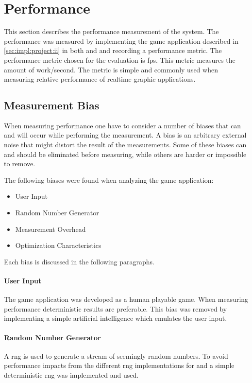 \section{Performance}

This section describes the performance measurement of the system.
The performance was measured by implementing the game application described in \autoref{sec:impl:project:ii} in both {\C} and {\rust} and recording a performance metric.
The performance metric chosen for the evaluation is \gls{fps}.
This metric measures the amount of work/second.
The metric is simple and commonly used when measuring relative performance of realtime graphic applications.

\subsection{Measurement Bias}
\label{sec:perf:bias}

When measuring performance one have to consider a number of biases that can and will occur while performing the measurement.
A bias is an arbitrary external noise that might distort the result of the measurements.
Some of these biases can and should be eliminated before measuring, while others are harder or impossible to remove.

The following biases were found when analyzing the game application:
\begin{itemize}
  \item User Input
  \item Random Number Generator
  \item Measurement Overhead
  \item Optimization Characteristics
\end{itemize}
Each bias is discussed in the following paragraphs.

\paragraph{User Input}
The game application was developed as a human playable game.
When measuring performance deterministic results are preferable.
This bias was removed by implementing a simple artificial intelligence which emulates the user input.

\paragraph{Random Number Generator}
A \gls{rng} is used to generate a stream of seemingly random numbers.
To avoid performance impacts from the different \gls{rng} implementations for {\C} and {\rust} a simple deterministic \gls{rng} was implemented and used.

